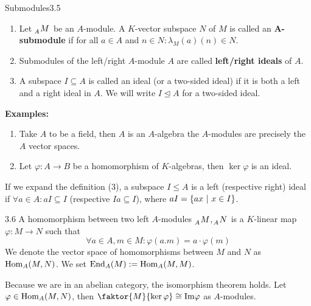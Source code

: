 \documentclass[twoside = false,	%
		headsepline,		%
		parskip = true,
		]{scrbook}						%
\begin{document}

        \begin{definition}{Submodules}{3.5}
            \begin{enumerate}
                \item
                    Let $\tensor[_A]{M}{}$ be an $A$-module. A $K$-vector subspace $N$ of $M$ is called an $\mathbf{A}$\textbf{-submodule} if for all $a \in A$ and $n \in N: \lambda_M(a)(n) \in N$.
                \item
                    Submodules of the left/right $A$-module $A$ are called \textbf{left/right ideals} of $A$.
                \item
                    A subspace $I \subseteq A$ is called an ideal (or a two-sided ideal) if it is both a left and a right ideal in $A$. We will write $I \trianglelefteq A$ for a two-sided ideal.
            \end{enumerate}
        \end{definition}

        \textbf{Examples:}
        \begin{enumerate}
            \item Take $A$ to be a field, then $A$ is an $A$-algebra the $A$-modules are precisely the $A$ vector spaces.
            \item Let $\varphi: A \to B$ be a homomorphism of $K$-algebras, then $\ker \varphi$ is an ideal.
        \end{enumerate}

        If we expand the definition (3), a subspace $I \leq A$ is a left (respective right) ideal if $\forall a \in A: aI \subseteq I$ (respective $Ia \subseteq I$), where $aI = \left\{ ax \ | \ x \in I\right\}$.

        \begin{definition}{}{3.6}
            A homomorphism between two left $A$-modules $\tensor[_A]{M}{},\tensor[_A]{N}{}$ is a $K$-linear map $\varphi: M \to N$ such that
            \begin{equation*}
                \forall a \in A, m \in M: \varphi(a.m) = a \cdot \varphi(m)
            \end{equation*}
            We denote the vector space of homomorphisms between $M$ and $N$ as $\mathrm{Hom}_A(M,N)$. We set $\mathrm{End}_A(M):= \mathrm{Hom}_A(M,M)$.
        \end{definition}

        Because we are in an abelian category, the isomorphism theorem holds. Let $\varphi \in \mathrm{Hom}_A(M,N)$, then $\faktor{M}{\ker \varphi} \cong \Img \varphi$ as $A$-modules.
\end{document}
